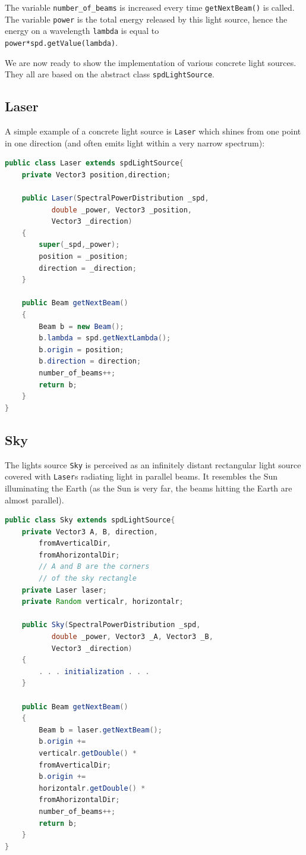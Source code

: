 \documentclass[12pt, letterpaper]{article}
\begin{document}
The variable \verb|number_of_beams| is increased every time \verb|getNextBeam()| is called. The variable \verb|power| is the total energy released by this light source, hence the energy on a wavelength \verb|lambda| is equal to\\
 \verb|power*spd.getValue(lambda)|.

We are now ready to show the implementation of various concrete light sources. They all are based on the abstract class \verb|spdLightSource|.

\subsection{Laser}

A simple example of a concrete light source is \verb|Laser| which shines from one point in one direction (and often emits light within a very narrow spectrum):
\begin{lstlisting}[language=Java]
public class Laser extends spdLightSource{
	private Vector3 position,direction;	
		
	public Laser(SpectralPowerDistribution _spd, 
	       double _power, Vector3 _position, 
	       Vector3 _direction)
	{
		super(_spd,_power);
		position = _position;
		direction = _direction;		
	}

	public Beam getNextBeam()
	{
		Beam b = new Beam();	
		b.lambda = spd.getNextLambda();
		b.origin = position;
		b.direction = direction;
		number_of_beams++;
		return b;
	}
}
\end{lstlisting}

\subsection{Sky}

The lights source \verb|Sky| is perceived as an infinitely distant rectangular light source covered with \verb|Laser|s radiating light in parallel beams. It
resembles the Sun illuminating the Earth (as the Sun is very far, the beams hitting the Earth are almost parallel).

\begin{lstlisting}[language=Java]
public class Sky extends spdLightSource{
	private Vector3 A, B, direction, 
		fromAverticalDir, 
		fromAhorizontalDir; 
		// A and B are the corners 
		// of the sky rectangle
	private Laser laser;
	private Random verticalr, horizontalr;	
		
	public Sky(SpectralPowerDistribution _spd, 
	       double _power, Vector3 _A, Vector3 _B, 
	       Vector3 _direction)
	{
		. . . initialization . . .
	}

	public Beam getNextBeam()
	{
		Beam b = laser.getNextBeam();
		b.origin += 
		verticalr.getDouble() * 
		fromAverticalDir;
		b.origin += 
		horizontalr.getDouble() * 
		fromAhorizontalDir;
		number_of_beams++;
		return b;
	}
}
\end{lstlisting}
\end{document}
